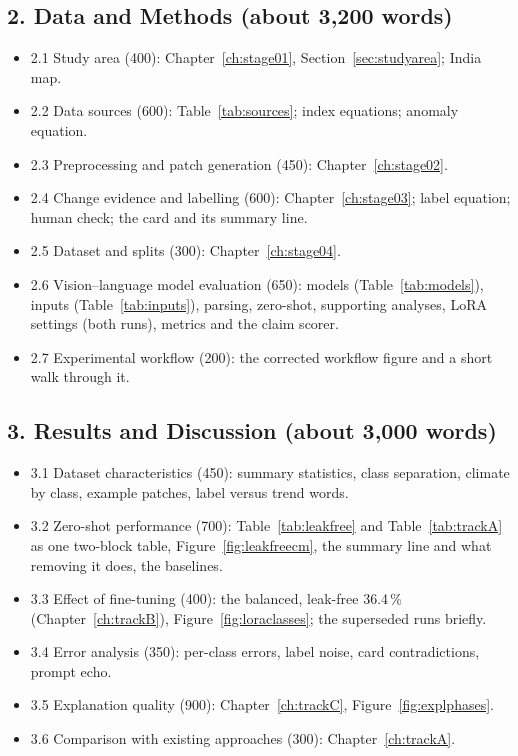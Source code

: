\subsection*{2. Data and Methods (about 3,200 words)}
\begin{itemize}
  \item 2.1 Study area (400): Chapter~\ref{ch:stage01}, Section~\ref{sec:studyarea}; India map.
  \item 2.2 Data sources (600): Table~\ref{tab:sources}; index equations; anomaly equation.
  \item 2.3 Preprocessing and patch generation (450): Chapter~\ref{ch:stage02}.
  \item 2.4 Change evidence and labelling (600): Chapter~\ref{ch:stage03}; label equation; human check; the card and its summary line.
  \item 2.5 Dataset and splits (300): Chapter~\ref{ch:stage04}.
  \item 2.6 Vision--language model evaluation (650): models (Table~\ref{tab:models}), inputs (Table~\ref{tab:inputs}), parsing, zero-shot, supporting analyses, LoRA settings (both runs), metrics and the claim scorer.
  \item 2.7 Experimental workflow (200): the corrected workflow figure and a short walk through it.
\end{itemize}

\subsection*{3. Results and Discussion (about 3,000 words)}
\begin{itemize}
  \item 3.1 Dataset characteristics (450): summary statistics, class separation, climate by class, example patches, label versus trend words.
  \item 3.2 Zero-shot performance (700): Table~\ref{tab:leakfree} and Table~\ref{tab:trackA} as one two-block table, Figure~\ref{fig:leakfreecm}, the summary line and what removing it does, the baselines.
  \item 3.3 Effect of fine-tuning (400): the balanced, leak-free 36.4\,\% (Chapter~\ref{ch:trackB}), Figure~\ref{fig:loraclasses}; the superseded runs briefly.
  \item 3.4 Error analysis (350): per-class errors, label noise, card contradictions, prompt echo.
  \item 3.5 Explanation quality (900): Chapter~\ref{ch:trackC}, Figure~\ref{fig:explphases}.
  \item 3.6 Comparison with existing approaches (300): Chapter~\ref{ch:trackA}.
\end{itemize}

